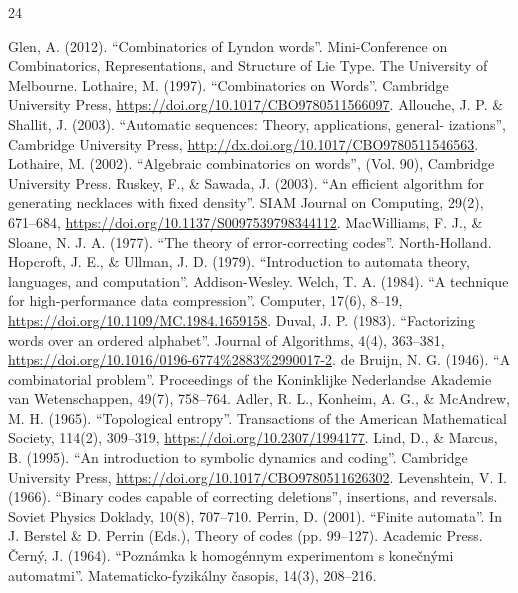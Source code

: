 \documentclass[12pt,a4paper]{article}
\begin{document}
\begin{thebibliography}{24}

 Glen, A. (2012). ``Combinatorics of Lyndon words''. Mini-Conference on Combinatorics, Representations, and Structure of Lie Type. The University of Melbourne.
\medskip
{} Lothaire, M. (1997). ``Combinatorics on Words''. Cambridge University Press, \url{https://doi.org/10.1017/CBO9780511566097}.
\medskip
{} Allouche, J. P. \& Shallit, J. (2003). ``Automatic sequences: Theory, applications, general-
izations'', Cambridge University Press, \url{http://dx.doi.org/10.1017/CBO9780511546563}.
\medskip
  Lothaire, M. (2002). ``Algebraic combinatorics on words'', (Vol. 90), Cambridge University
Press.
\medskip
{} Ruskey, F., \& Sawada, J. (2003). ``An efficient algorithm for generating necklaces with fixed density''. SIAM Journal on Computing, 29(2), 671--684, \url{https://doi.org/10.1137/S0097539798344112}.
\medskip
{} MacWilliams, F. J., \& Sloane, N. J. A. (1977). ``The theory of error-correcting codes''. North-Holland.
\medskip
{} Hopcroft, J. E., \& Ullman, J. D. (1979). ``Introduction to automata theory, languages, and computation''. Addison-Wesley.
\medskip
{} Welch, T. A. (1984). ``A technique for high-performance data compression''. Computer, 17(6), 8--19, \url{https://doi.org/10.1109/MC.1984.1659158}.
\medskip
{} Duval, J. P. (1983). ``Factorizing words over an ordered alphabet''. Journal of Algorithms, 4(4), 363--381, \url{https://doi.org/10.1016/0196-6774%2883%2990017-2}.
\medskip
{} de Bruijn, N. G. (1946). ``A combinatorial problem''. Proceedings of the Koninklijke Nederlandse Akademie van Wetenschappen, 49(7), 758--764.
\medskip
{} Adler, R. L., Konheim, A. G., \& McAndrew, M. H. (1965). ``Topological entropy''. Transactions of the American Mathematical Society, 114(2), 309--319, \url{https://doi.org/10.2307/1994177}.
\medskip
{} Lind, D., \& Marcus, B. (1995). ``An introduction to symbolic dynamics and coding''. Cambridge University Press, \url{https://doi.org/10.1017/CBO9780511626302}.
\medskip
{} Levenshtein, V. I. (1966). ``Binary codes capable of correcting deletions'', insertions, and reversals. Soviet Physics Doklady, 10(8), 707--710.
\medskip
{} Perrin, D. (2001). ``Finite automata''. In J. Berstel \& D. Perrin (Eds.), Theory of codes (pp. 99--127). Academic Press.
\medskip
{}
Černý, J. (1964). ``Poznámka k homogénnym experimentom s konečnými automatmi''. Matematicko-fyzikálny časopis, 14(3), 208--216.

\end{thebibliography}
\end{document}
